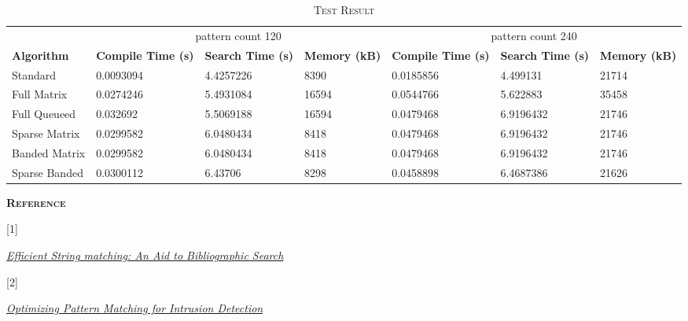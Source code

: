 \documentclass[a4paper]{article}
\begin{document}
\begin{table}
\caption{\textsc{Test Result}}
\begin{tabular}{ |l|p{2cm}|p{2cm}|p{2cm}|p{2cm}|p{2cm}|p{2cm}| }
\hline\hline
& \multicolumn{3}{|c|}{pattern count 120}  &
  \multicolumn{3}{|c|}{pattern count 240} \\
\cline{2-7}
\textbf{Algorithm} & \textbf{Compile Time (s)}  & \textbf{Search Time (s)} & \textbf{Memory (kB)} & \textbf{Compile Time (s)} & \textbf{Search Time (s)} & \textbf{Memory (kB)} \\
\hline\hline
Standard      & 0.0093094 & 4.4257226 & 8390 & 0.0185856 & 4.499131 & 21714\\
Full Matrix   & 0.0274246 & 5.4931084 & 16594 & 0.0544766 & 5.622883 & 35458\\
Full Queueed  & 0.032692  & 5.5069188 & 16594 & 0.0479468 & 6.9196432 & 21746\\
Sparse Matrix & 0.0299582 & 6.0480434 & 8418 & 0.0479468 & 6.9196432 & 21746\\
Banded Matrix & 0.0299582 & 6.0480434 & 8418 & 0.0479468 & 6.9196432 & 21746\\
Sparse Banded & 0.0300112 & 6.43706 & 8298 & 0.0458898 & 6.4687386 & 21626\\
\hline
\end{tabular}
\end{table}


\textsc{\textbf{Reference}}

\hypertarget{effic}{[1]} \href{http://cr.yp.to/bib/1975/aho.pdf}{\textit{Efficient String matching: An Aid to Bibliographic Search}}

\hypertarget{snort}{[2]} \href{http://citeseerx.ist.psu.edu/viewdoc/download?doi=10.1.1.103.4663&rep=rep1&type=pdf}{\textit{Optimizing Pattern Matching for Intrusion Detection}}
\end{document}
